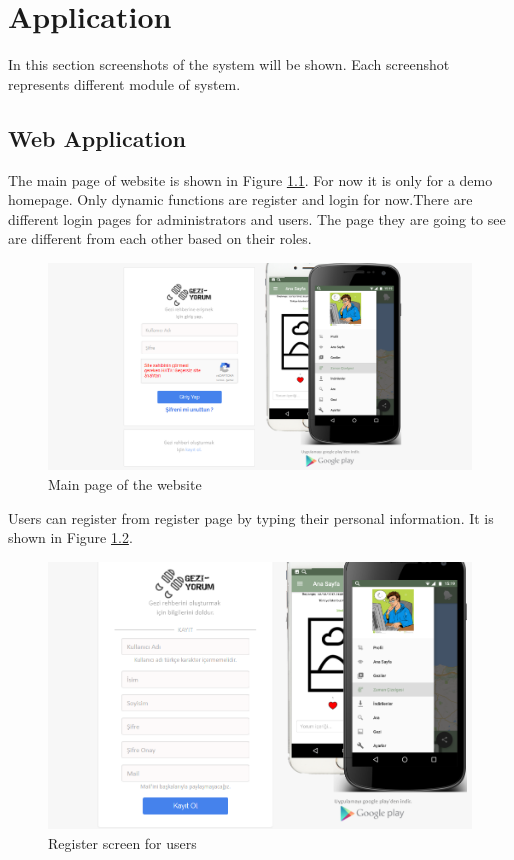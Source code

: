 \chapter{Application}

In this section screenshots of the system will be shown. Each screenshot represents different module of system.

\section{Web Application}

The main page of website is shown in Figure \ref{fig:main1}. For now it is only for a demo homepage. Only dynamic functions are register and login for now.There are different login pages for administrators and users. The page they are going to see are different from each other based on their roles.

\begin{figure}[!htbp]
\centering
\includegraphics[width=\textwidth]{projectChapters/images/main1.png}
\caption{Main page of the website}
\label{fig:main1}
\end{figure}

\newpage

Users can register from register page by typing their personal information. It is shown in Figure  \ref{fig:registerWeb}. 

\begin{figure}[!htbp]
\centering
\includegraphics[width=\textwidth]{projectChapters/images/main2.png}
\caption{Register screen for users}
\label{fig:registerWeb}
\end{figure}

